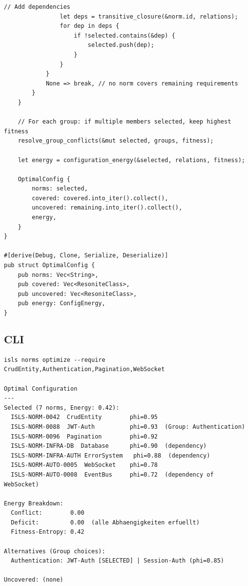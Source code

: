 \documentclass[11pt,a4paper]{article}
\begin{document}
\begin{lstlisting}[style=rust]
                // Add dependencies
                let deps = transitive_closure(&norm.id, relations);
                for dep in deps {
                    if !selected.contains(&dep) {
                        selected.push(dep);
                    }
                }
            }
            None => break, // no norm covers remaining requirements
        }
    }
    
    // For each group: if multiple members selected, keep highest fitness
    resolve_group_conflicts(&mut selected, groups, fitness);
    
    let energy = configuration_energy(&selected, relations, fitness);
    
    OptimalConfig {
        norms: selected,
        covered: covered.into_iter().collect(),
        uncovered: remaining.into_iter().collect(),
        energy,
    }
}

#[derive(Debug, Clone, Serialize, Deserialize)]
pub struct OptimalConfig {
    pub norms: Vec<String>,
    pub covered: Vec<ResoniteClass>,
    pub uncovered: Vec<ResoniteClass>,
    pub energy: ConfigEnergy,
}
\end{lstlisting}

\subsection{CLI}

\begin{lstlisting}[style=bash]
isls norms optimize --require CrudEntity,Authentication,Pagination,WebSocket

Optimal Configuration
---
Selected (7 norms, Energy: 0.42):
  ISLS-NORM-0042  CrudEntity        phi=0.95
  ISLS-NORM-0088  JWT-Auth          phi=0.93  (Group: Authentication)
  ISLS-NORM-0096  Pagination        phi=0.92
  ISLS-NORM-INFRA-DB  Database      phi=0.90  (dependency)
  ISLS-NORM-INFRA-AUTH ErrorSystem   phi=0.88  (dependency)
  ISLS-NORM-AUTO-0005  WebSocket    phi=0.78
  ISLS-NORM-AUTO-0008  EventBus     phi=0.72  (dependency of WebSocket)

Energy Breakdown:
  Conflict:        0.00
  Deficit:         0.00  (alle Abhaengigkeiten erfuellt)
  Fitness-Entropy: 0.42

Alternatives (Group choices):
  Authentication: JWT-Auth [SELECTED] | Session-Auth (phi=0.85)
  
Uncovered: (none)
\end{lstlisting}

\end{document}
